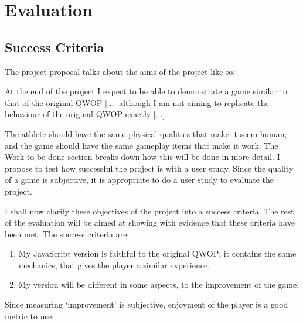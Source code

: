 \documentclass[12pt,a4paper,twoside,openright]{report}
\begin{document}
\chapter{Evaluation}
\section{Success Criteria}

The project proposal talks about the aims of the project like so:

\begin{displayquote}
At the end of the project I expect to be able to demonstrate a game similar to that of the original QWOP [...] although I am not aiming to replicate the behaviour of the original QWOP exactly [...]
\end{displayquote}
\begin{displayquote}
The athlete should have the same physical qualities that make it seem human, and the game should have the same gameplay items that make it work. The Work to be done section breaks down how this will be done in more detail.
I propose to test how successful the project is with a user study. Since the quality of a game is subjective, it is appropriate to do a user study to evaluate the project.
\end{displayquote}

I shall now clarify these objectives of the project into a success criteria.
The rest of the evaluation will be aimed at showing with evidence that these criteria have been met.
The success criteria are:


\begin{enumerate} 
	\item My JavaScript version is faithful to the original QWOP; it contains the same mechanics, 
	that gives the player a similar experience.
	\item My version will be different in some aspects, to the improvement of the game.
\end{enumerate}

Since measuring `improvement' is subjective, enjoyment of the player is a good metric to use. 
\end{document}
